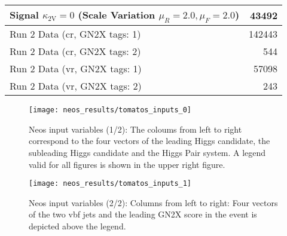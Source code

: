 \begin{table}[]
\begin{tabular}{lr}
        Signal $\kappa_\mathrm{2V}=0$ (Scale Variation $\mu_R = 2.0, \mu_F=2.0$) & 43492  \\ \hline
        Run 2 Data (\ac{cr}, GN2X tags: 1)                                       & 142443 \\
        Run 2 Data (\ac{cr}, GN2X tags: 2)                                       & 544    \\
        Run 2 Data (\ac{vr}, GN2X tags: 1)                                       & 57098  \\
        Run 2 Data (\ac{vr}, GN2X tags: 2)                                       & 243    \\
    \end{tabular}
    \label{tab:neos-samples}
\end{table}


\begin{figure}
    \centering
    \texttt{[image: neos\_results/tomatos\_inputs\_0]}
    \caption[]{Neos input variables (1/2): The coloums from left to right correspond to the four vectors of the leading Higgs candidate, the subleading Higgs candidate and the Higgs Pair system. A legend valid for all figures is shown in the upper right figure.}
    \label{fig:tomatos_inputs_0}
\end{figure}



\begin{figure}
    \centering
    \texttt{[image: neos\_results/tomatos\_inputs\_1]}
    \caption[]{Neos input variables (2/2): Columns from left to right: Four vectors of the two vbf jets and the leading GN2X score in the event is depicted above the legend.}
    \label{fig:tomatos_inputs_1}
\end{figure}
